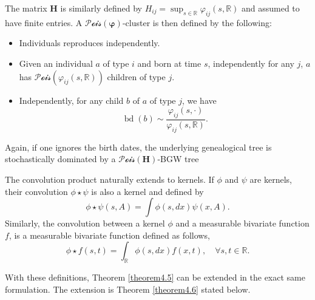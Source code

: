 \documentclass[reqno,final,11pt]{amsart}
\theoremstyle{plain}
\theoremstyle{definition}
\theoremstyle{remark}
\newcommand{\R}{\mathds{R}}
\newcommand{\itg}{\displaystyle\int}
\renewcommand{\H}{\bm{H}}
\newcommand{\Pois}{\mathscr{P}\!\mathscr{o}\!\mathscr{i}\!\mathscr{s}}
\DeclareMathOperator{\bd}{bd}
\begin{document}
The matrix $\H$ is similarly defined by $H_{ij} = \sup_{s\in\R}\varphi_{ij}(s,\R)$ and assumed to have finite entries. A $\Pois(\bm{\varphi})$-cluster is then defined by the following:
\begin{itemize}
	\item Individuals reproduces independently.
	\item Given an individual $a$ of type $i$ and born at time $s$, independently for any $j$, $a$ has $\Pois(\varphi_{ij}(s,\R))$ children of type $j$.
	\item Independently, for any child $b$ of $a$ of type $j$, we have \[\bd(b) \sim \frac{\varphi_{ij}(s,\cdot)}{\varphi_{ij}(s,\R)}.\]
\end{itemize}

Again, if one ignores the birth dates, the underlying genealogical tree is stochastically dominated by a $\Pois(\H)$-BGW tree

The convolution product naturally extends to kernels. If $\phi$ and $\psi$ are kernels, their convolution $\phi\star\psi$ is also a kernel and defined by
\begin{equation*}
	\phi \star \psi(s,A) = \itg \phi(s,dx)\psi(x,A).
\end{equation*}
Similarly, the convolution between a kernel $\phi$ and a measurable bivariate function $f$, is a measurable bivariate function defined as follows, 
\begin{equation*}
	\phi \star f (s,t) = \itg_{\R} \phi(s,dx) f(x,t), \quad \forall s,t\in\R.
\end{equation*}

With these definitions, Theorem \ref{theorem4.5} can be extended in the exact same formulation. The extension is Theorem \ref{theorem4.6} stated below.
\end{document}
